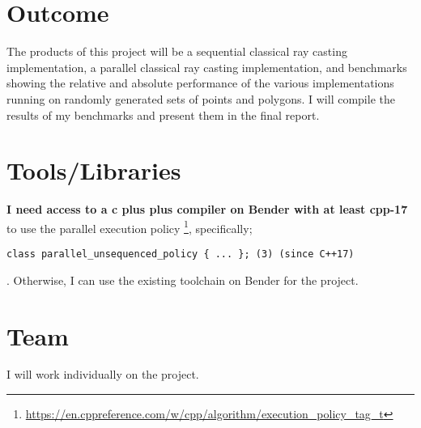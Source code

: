 \documentclass{article}
\begin{document}
\section{Outcome}
The products of this project will be a sequential classical ray casting implementation, a parallel classical ray casting implementation, and benchmarks showing the relative and absolute performance of the various implementations running on randomly generated sets of points and polygons. I will compile the results of my benchmarks and present them in the final report.

\section{Tools/Libraries}
\textbf{I need access to a c plus plus compiler on Bender with at least cpp-17} to use the parallel execution policy \footnote{\url{https://en.cppreference.com/w/cpp/algorithm/execution_policy_tag_t}}, specifically;
\begin{verbatim}
class parallel_unsequenced_policy { ... }; (3) (since C++17)
\end{verbatim}
. Otherwise, I can use the existing toolchain on Bender for the project.

\section{Team}
I will work individually on the project.
\end{document}
